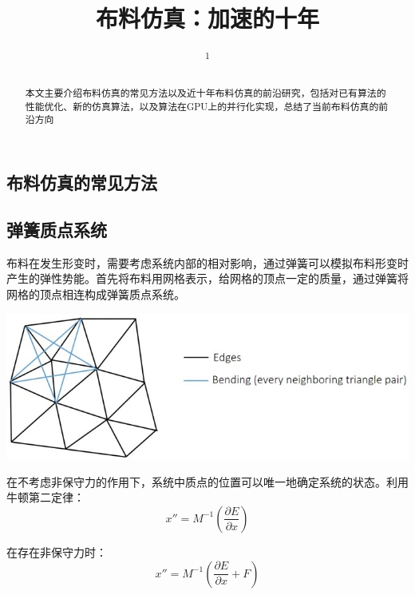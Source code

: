 \documentclass{CLGPY}
\title[布料仿真]{布料仿真：加速的十年}%
\author[]{\textsuperscript{1}}%
\institute{({})}%
\begin{document}
    \maketitle%
    \begin{abstract}%
        本文主要介绍布料仿真的常见方法以及近十年布料仿真的前沿研究，包括对已有算法的性能优化、新的仿真算法，以及算法在GPU上的并行化实现，总结了当前布料仿真的前沿方向
    \end{abstract}
    \begin{multicols}{2}%
        \section{布料仿真的常见方法}
        \subsection{弹簧质点系统}
        布料在发生形变时，需要考虑系统内部的相对影响，通过弹簧可以模拟布料形变时产生的弹性势能。首先将布料用网格表示，给网格的顶点一定的质量，通过弹簧将网格的顶点相连构成弹簧质点系统。
        \begin{center}
            \includegraphics[width=1.0\linewidth]{./fig/弹簧质点模型.jpg}
        \end{center}

        在不考虑非保守力的作用下，系统中质点的位置可以唯一地确定系统的状态。利用牛顿第二定律：
        \begin{equation}
			x''=M^{-1}(\frac{\partial E}{\partial x})
        \end{equation}

        在存在非保守力时：
        \begin{equation}
            x''=M^{-1}(\frac{\partial E}{\partial x}+F)
        \end{equation}


\end{multicols}
\end{document}
